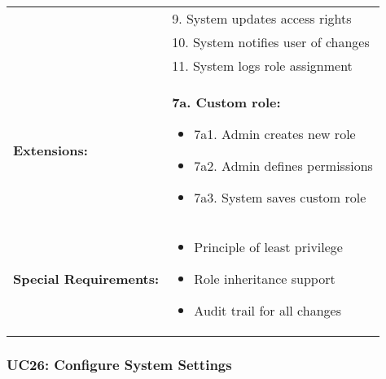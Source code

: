\documentclass[12pt]{article}
\begin{document}
\begin{tabular}{|p{3cm}|p{11cm}|}
& 9. System updates access rights \\
& 10. System notifies user of changes \\
& 11. System logs role assignment \\
\hline
\textbf{Extensions:} & 
\textbf{7a. Custom role:}
\begin{itemize}
    \item 7a1. Admin creates new role
    \item 7a2. Admin defines permissions
    \item 7a3. System saves custom role
\end{itemize} \\
\hline
\textbf{Special Requirements:} & 
\begin{itemize}
    \item Principle of least privilege
    \item Role inheritance support
    \item Audit trail for all changes
\end{itemize} \\
\hline
\end{tabular}

\subsubsection{UC26: Configure System Settings}
\end{document}
